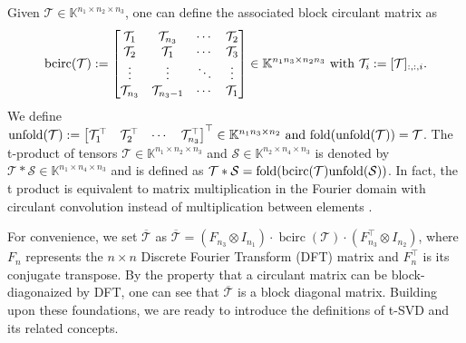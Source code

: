\documentclass[twoside,12pt]{article}
\def\T{\mathcal{T}}
\def\T{\mathcal{T}}
\begin{document}
  Given $\mathcal{T}\in \mathbb{K}^{n_1\times n_2\times n_3}$, one can define the associated block circulant matrix  as 
\[\textnormal{bcirc}(\mathcal{T}):=\begin{bmatrix} \mathcal{T}_1 & \mathcal{T}_{n_3} & \cdots & \mathcal{T}_2\\
\mathcal{T}_2 & \mathcal{T}_1 & \cdots & \mathcal{T}_3\\
\vdots & \vdots & \ddots & \vdots\\
\mathcal{T}_{n_3} & \mathcal{T}_{n_3-1} & \cdots & \mathcal{T}_1\end{bmatrix} \in \mathbb{K}^{n_{1}n_{3}\times n_{2}n_{3}} \text{ with }\mathcal{T}_{i}:=[\mathcal{T}]_{:,:,i}.\]
We  define 
$\textnormal{unfold}(\mathcal{T}):= \begin{bmatrix} \mathcal{T}_1^\top&\T_2^\top&\cdots &\mathcal{T}_{n_3}^\top\end{bmatrix}^\top\in\mathbb{K}^{n_1n_3\times n_2}
\text{ and }
\textnormal{fold}(\textnormal{unfold}(\mathcal{T}))=\T$.  
The t-product of tensors $\mathcal{T}\in\mathbb{K}^{n_1\times n_2\times n_3}$ and $\mathcal{S}\in\mathbb{K}^{n_2\times n_4\times n_3}$ is denoted by $\mathcal{T}\ast\mathcal{S}\in\mathbb{K}^{n_1\times n_4\times n_3}$ and is defined as
$
\T\ast\mathcal{S}= \textnormal{fold}(\textnormal{bcirc}(\T)\textnormal{unfold}(\mathcal{S}))$. In fact, the t product is equivalent to matrix multiplication in the Fourier domain with circulant convolution instead of multiplication between elements
\citep{kilmer2011factorization}. %

For convenience, we set $\overline{\mathcal{T}}$ as
$
\overline{\mathcal{T}} = \left(F_{n_3} \otimes I_{n_1}\right) \cdot \operatorname{bcirc}(\mathcal{T})\cdot\left(F_{n_3}^{\top} \otimes I_{n_2}\right)$,
where $F_{n}$   represents the $n \times n$ Discrete Fourier Transform (DFT) matrix and $F_{n}^{\top}$ is its conjugate transpose.
By the property that a circulant matrix can be block-diagonaized by DFT, one can see that $\overline{\mathcal{T}}$ is a block diagonal matrix. Building upon these foundations, we are ready to introduce the definitions of t-SVD and its related concepts. %
\end{document}
